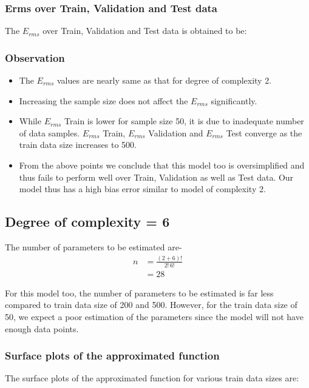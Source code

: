 \documentclass[12pt,a4paper]{article}
\newcommand{\noi}{\noindent}
\begin{document}
\subsubsection{Erms over Train, Validation and Test data}
The $E_{rms}$ over Train, Validation and Test data is obtained to be:


\subsubsection{Observation}
\begin{itemize}
    \itemsep0em
    \item The $E_{rms}$ values are nearly same as that for degree of complexity 2.
    \item Increasing the sample size does not affect the $E_{rms}$ significantly.
    \item While $E_{rms}$ Train is lower for sample size 50, it is due to inadequate number of data samples. $E_{rms}$ Train, $E_{rms}$ Validation and $E_{rms}$ Test converge as the train data size increases to 500.
    \item From the above points we conclude that this model too is oversimplified and thus fails to perform well over Train, Validation as well as Test data. Our model thus has a high bias error similar to model of complexity 2. 
\end{itemize}

\subsection{Degree of complexity = 6}
The number of parameters to be estimated are-
\begin{equation}
    \begin{split}
        n&=\frac{(2+6)!}{2!\,6!} \\
        &=28
    \end{split}
\end{equation}

\noi
For this model too, the number of parameters to be estimated is far less compared to train data size of 200 and 500. However, for the train data size of 50, we expect a poor estimation of the parameters since the model will not have enough data points. 

\subsubsection{Surface plots of the approximated function}
The surface plots of the approximated function for various train data sizes are:
\end{document}
